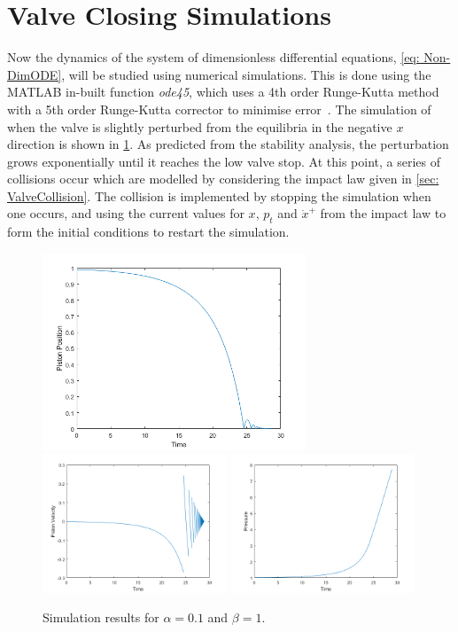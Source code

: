 \section{Valve Closing Simulations} \label{sec: ClosingSimulation}

Now the dynamics of the system of dimensionless differential equations, \cref{eq: Non-DimODE}, will be studied using numerical simulations. This is done using the MATLAB in-built function \textit{ode45}, which uses a 4th order Runge-Kutta method with a 5th order Runge-Kutta corrector to minimise error~\cite{Shampine1997TheSuite}. The simulation of when the valve is slightly perturbed from the equilibria in the negative $x$ direction is shown in \cref{fig:TimeTrajec}. As predicted from the stability analysis, the perturbation grows exponentially until it reaches the low valve stop. At this point, a series of collisions occur which are modelled by considering the impact law given in \cref{sec: ValveCollision}. The collision is implemented by stopping the simulation when one occurs, and using the current values for $x$, $p_t$ and $\dot{x}^+$ from the impact law to form the initial conditions to restart the simulation.
~
\begin{figure}[!ht]
    \centering
    \includegraphics[width=0.7\textwidth]{Figures/Example/PositionTimeTrajectory.png}
    \includegraphics[width=0.49\textwidth]{Figures/Example/VelocityTimeTrajectory.png}
    \includegraphics[width=0.49\textwidth]{Figures/Example/PressureTimeTrajectory.png}
    \caption{Simulation results for $\alpha = 0.1$ and $\beta = 1$.}
    \label{fig:TimeTrajec}
\end{figure}

